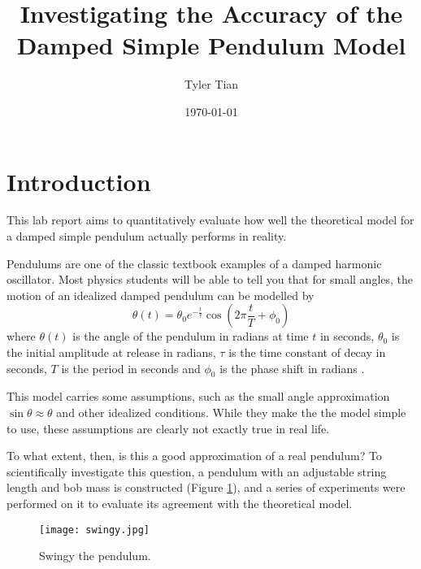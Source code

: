 \documentclass[aps,twocolumn,secnumarabic,nobalancelastpage,amsmath,amssymb,nofootinbib,floatfix,letterpaper]{revtex4}
\begin{document}
\title{Investigating the Accuracy of the Damped Simple Pendulum Model}
\author{Tyler Tian}
\noaffiliation
\date{\today}



\maketitle


\section{Introduction}

This lab report aims to quantitatively evaluate how well the theoretical model for a damped simple pendulum actually
performs in reality.

Pendulums are one of the classic textbook examples of a damped harmonic oscillator. Most physics students will be able
to tell you that for small angles, the motion of an idealized damped pendulum can be modelled by
\begin{equation}
    \theta(t) = \theta_0 e^{-\frac{t}{\tau}}\cos\left(2\pi\frac{t}{T} + \phi_0\right)
    \label{eqn:model}
\end{equation}
where \(\theta(t)\) is the angle of the pendulum in radians at time \(t\) in seconds, \(\theta_0\) is the initial
amplitude at release in radians, \(\tau\) is the time constant of decay in seconds, \(T\) is the period in seconds and
\(\phi_0\) is the phase shift in radians \cite{lab}.

This model carries some assumptions, such as the small angle approximation \(\sin \theta \approx \theta\) \cite[p. 507]{mazur}
and other idealized conditions. While they make the the model simple to use, these assumptions are clearly not exactly
true in real life.

To what extent, then, is this a good approximation of a real pendulum? To scientifically investigate this question, a
pendulum with an adjustable string length and bob mass is constructed (Figure \ref{fig:swingy}), and a series of
experiments were performed on it to evaluate its agreement with the theoretical model.

\begin{figure}[htb]
    \centering
    \texttt{[image: swingy.jpg]}
    \caption{Swingy the pendulum.}
    \label{fig:swingy}
\end{figure}
\end{document}
